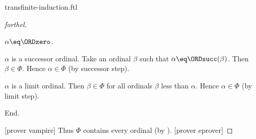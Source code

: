 \documentclass{naproche-library}
\begin{document}
\begin{smodule}[title=Transfinite Induction]{transfinite-induction.ftl}
\begin{proof}[forthel]
    \begin{case}{$\alpha \eq \ORDzero$.} \end{case}

    \begin{case}{$\alpha$ is a successor ordinal.}
      Take an ordinal $\beta$ such that $\alpha \eq \ORDsucc(\beta)$.
      Then $\beta \in \Phi$.
      Hence $\alpha \in \Phi$ (by successor step).
    \end{case}

    \begin{case}{$\alpha$ is a limit ordinal.}
      Then $\beta \in \Phi$ for all ordinals $\beta$ less than $\alpha$.
      Hence $\alpha \in \Phi$ (by limit step).
    \end{case}
  End.

  [prover vampire]
  Thus $\Phi$ contains every ordinal (by ).
  [prover eprover]
\end{proof}
\end{smodule}
\end{document}
